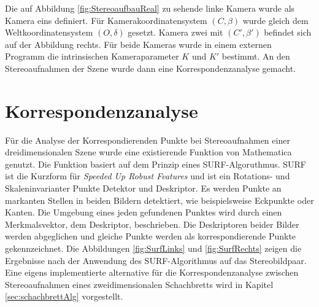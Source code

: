 
Die auf Abbildung \ref{fig:StereoaufbauReal} zu sehende linke Kamera wurde als Kamera eins definiert. Für Kamerakoordinatensystem $(C,\beta)$ wurde gleich dem Weltkoordinatensystem $(O,\delta)$ gesetzt. Kamera zwei mit $(C',\beta')$ befindet sich auf der Abbildung rechts. Für beide Kameras wurde in einem externen Programm die intrinsischen Kameraparameter $K$ und $K'$ bestimmt. An den Stereoaufnahmen der Szene wurde dann eine Korrespondenzanalyse gemacht.   

\section{Korrespondenzanalyse}


Für die Analyse der Korrespondierenden Punkte bei Stereoaufnahmen einer dreidimensionalen Szene wurde eine existierende Funktion von Mathematica genutzt\cite{Mathematica}. Die Funktion basiert auf dem Prinzip eines SURF-Algoruthmus. SURF ist die Kurzform für  \textit{Speeded Up Robust Features} und ist ein Rotations- und Skaleninvarianter Punkte Detektor und Deskriptor\cite{SURF,SIFTSURF}. Es werden Punkte an markanten Stellen in beiden Bildern detektiert, wie beispielsweise Eckpunkte oder Kanten. Die Umgebung eines jeden gefundenen Punktes wird durch einen Merkmalsvektor, dem Deskriptor, beschrieben. Die Deskriptoren beider Bilder werden abgeglichen und gleiche Punkte werden als korrespondierende Punkte gekennzeichnet\cite{SURF,SIFTSURF}. Die Abbildungen \ref{fig:SurfLinks} und \ref{fig:SurfRechts} zeigen die Ergebnisse nach der Anwendung des SURF-Algorithmus auf das Stereobildpaar. Eine eigens implementierte alternative für die Korrespondenzanalyse zwischen Stereoaufnahmen eines zweidimensionalen Schachbretts wird in Kapitel \ref{sec:schachbrettAlg} vorgestellt.  


